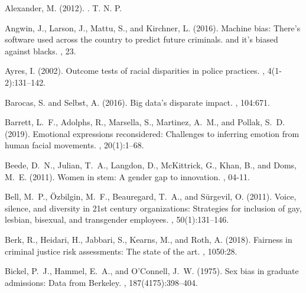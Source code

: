 \documentclass[11pt,dvipdfm]{article}
\begin{document}
\begin{thebibliography}{}
	
	Alexander, M. (2012).
	.
	\newblock T. N. P.
	
	Angwin, J., Larson, J., Mattu, S., and Kirchner, L. (2016).
	\newblock Machine bias: There's software used across the country to predict
	future criminals. and it's biased against blacks.
	, 23.
	
	Ayres, I. (2002).
	\newblock Outcome tests of racial disparities in police practices.
	, 4(1-2):131--142.
	
	Barocas, S. and Selbst, A. (2016).
	\newblock Big data's disparate impact.
	, 104:671.
	
	Barrett, L.~F., Adolphs, R., Marsella, S., Martinez, A.~M., and Pollak, S.~D.
	(2019).
	\newblock Emotional expressions reconsidered: Challenges to inferring emotion
	from human facial movements.
	, 20(1):1--68.
	
	Beede, D.~N., Julian, T.~A., Langdon, D., McKittrick, G., Khan, B., and Doms,
	M.~E. (2011).
	\newblock Women in stem: A gender gap to innovation.
	, 04-11.
	
	Bell, M.~P., {\"O}zbilgin, M.~F., Beauregard, T.~A., and S{\"u}rgevil, O.
	(2011).
	\newblock Voice, silence, and diversity in 21st century organizations:
	Strategies for inclusion of gay, lesbian, bisexual, and transgender
	employees.
	, 50(1):131--146.
	
	Berk, R., Heidari, H., Jabbari, S., Kearns, M., and Roth, A. (2018).
	\newblock Fairness in criminal justice risk assessments: The state of the art.
	, 1050:28.
	
	Bickel, P.~J., Hammel, E.~A., and O'Connell, J.~W. (1975).
	\newblock Sex bias in graduate admissions: Data from {B}erkeley.
	, 187(4175):398--404.
	

\end{thebibliography}
\end{document}
